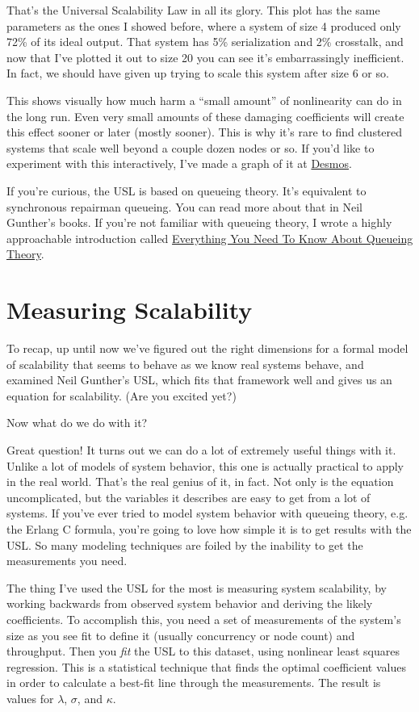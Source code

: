 \documentclass{vivid_layout}
\begin{document}
That's the Universal Scalability Law in all its glory.  This plot has the same
parameters as the ones I showed before, where a system of size 4 produced only
72\% of its ideal output. That system has 5\% serialization and 2\% crosstalk,
and now that I've plotted it out to size 20 you can see it's embarrassingly
inefficient.  In fact, we should have given up trying to scale this system after
size 6 or so.

This shows visually how much harm a ``small amount'' of nonlinearity can do in
the long run.  Even very small amounts of these damaging coefficients will
create this effect sooner or later (mostly sooner). This is why it's rare to
find clustered systems that scale well beyond a couple dozen nodes or so.
If you'd like to experiment with this interactively, I've made a graph of it at
\href{https://www.desmos.com/calculator/2l0jcjmsxn}{Desmos}.

If you're curious, the USL is based on queueing theory. It's equivalent to
synchronous repairman queueing. You can read more about that in Neil Gunther's
books. If you're not familiar with queueing theory, I wrote a highly
approachable introduction called
\href{https://www.vividcortex.com/resources/queueing-theory/}{Everything You
Need To Know About Queueing Theory}.

\section{Measuring Scalability}

To recap, up until now we've figured out the right dimensions for a formal model
of scalability that seems to behave as we know real systems behave, and examined
Neil Gunther's USL, which fits that framework well and gives us an equation for
scalability. (Are you excited yet?)

Now what do we do with it?

Great question! It turns out we can do a lot of extremely useful things with it.
Unlike a lot of models of system behavior, this one is actually practical to
apply in the real world. That's the real genius of it, in fact. Not only is the
equation uncomplicated, but the variables it describes are easy to get from a
lot of systems.  If you've ever tried to model system behavior with queueing
theory, e.g. the Erlang C formula, you're going to love how simple it is to get
results with the USL. So many modeling techniques are foiled by the inability to
get the measurements you need.

The thing I've used the USL for the most is measuring system scalability, by
working backwards from observed system behavior and deriving the likely
coefficients. To accomplish this, you need a set of measurements of the system's
size as you see fit to define it (usually concurrency or node count) and
throughput. Then you {\itshape fit} the USL to this dataset, using nonlinear
least squares regression. This is a statistical technique that finds the optimal
coefficient values in order to calculate a best-fit line through the
measurements. The result is values for $\lambda$, $\sigma$, and $\kappa$.
\end{document}
